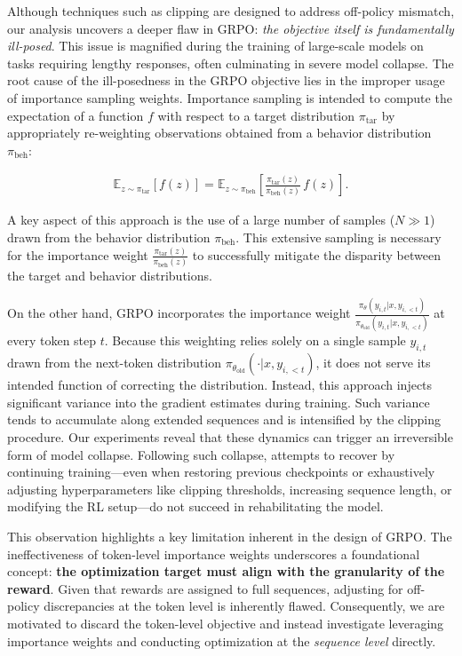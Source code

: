 Although techniques such as clipping are designed to address off-policy mismatch, our analysis uncovers a deeper flaw in GRPO: \textit{the objective itself is fundamentally ill-posed}. This issue is magnified during the training of large-scale models on tasks requiring lengthy responses, often culminating in severe model collapse. The root cause of the ill-posedness in the GRPO objective lies in the improper usage of importance sampling weights. Importance sampling is intended to compute the expectation of a function $f$ with respect to a target distribution $\pi_\text{tar}$ by appropriately re-weighting observations obtained from a behavior distribution $\pi_\text{beh}$:

\begin{align}
\mathbb{E}_{z \sim \pi_\text{tar}} \left[ f(z) \right] = \mathbb{E}_{z \sim \pi_\text{beh}} \left[ \frac{ \pi_\text{tar} (z) }{ \pi_\text{beh} (z)} \, f(z) \right].
\end{align}

A key aspect of this approach is the use of a large number of samples ($N \gg 1$) drawn from the behavior distribution $\pi_\text{beh}$. This extensive sampling is necessary for the importance weight $\frac{ \pi_\text{tar} (z) }{ \pi_\text{beh} (z)}$ to successfully mitigate the disparity between the target and behavior distributions.

On the other hand, GRPO incorporates the importance weight $\frac{ \pi_{\theta} (y_{i,t} | x, y_{i,<t}) }{ \pi_{\theta_\text{old}} (y_{i,t} | x,y_{i,<t})}$ at every token step $t$. Because this weighting relies solely on a single sample $y_{i,t}$ drawn from the next-token distribution $\pi_{\theta_\text{old}}( \cdot | x, y_{i, <t})$, it does not serve its intended function of correcting the distribution. Instead, this approach injects significant variance into the gradient estimates during training. Such variance tends to accumulate along extended sequences and is intensified by the clipping procedure. Our experiments reveal that these dynamics can trigger an irreversible form of model collapse. Following such collapse, attempts to recover by continuing training—even when restoring previous checkpoints or exhaustively adjusting hyperparameters like clipping thresholds, increasing sequence length, or modifying the RL setup—do not succeed in rehabilitating the model.

This observation highlights a key limitation inherent in the design of GRPO. The ineffectiveness of token-level importance weights underscores a foundational concept: \textbf{the optimization target must align with the granularity of the reward}. Given that rewards are assigned to full sequences, adjusting for off-policy discrepancies at the token level is inherently flawed. Consequently, we are motivated to discard the token-level objective and instead investigate leveraging importance weights and conducting optimization at the \textit{sequence level} directly.

